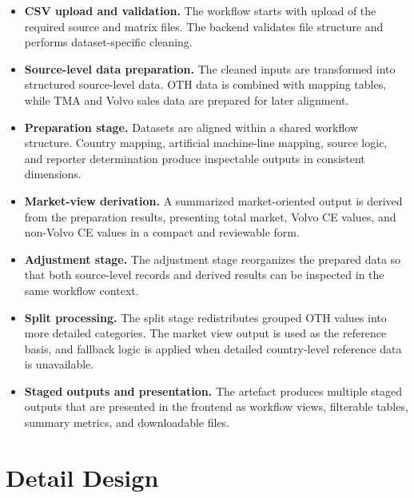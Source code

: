 \begin{itemize}
    \item \textbf{CSV upload and validation.}  
    The workflow starts with upload of the required source and matrix files. The backend validates file structure and performs dataset-specific cleaning.

    \item \textbf{Source-level data preparation.}  
    The cleaned inputs are transformed into structured source-level data. OTH data is combined with mapping tables, while TMA and Volvo sales data are prepared for later alignment.

    \item \textbf{Preparation stage.}  
    Datasets are aligned within a shared workflow structure. Country mapping, artificial machine-line mapping, source logic, and reporter determination produce inspectable outputs in consistent dimensions.

    \item \textbf{Market-view derivation.}  
    A summarized market-oriented output is derived from the preparation results, presenting total market, Volvo CE values, and non-Volvo CE values in a compact and reviewable form.

    \item \textbf{Adjustment stage.}  
    The adjustment stage reorganizes the prepared data so that both source-level records and derived results can be inspected in the same workflow context.

    \item \textbf{Split processing.}  
    The split stage redistributes grouped OTH values into more detailed categories. The market view output is used as the reference basis, and fallback logic is applied when detailed country-level reference data is unavailable.

    \item \textbf{Staged outputs and presentation.}  
    The artefact produces multiple staged outputs that are presented in the frontend as workflow views, filterable tables, summary metrics, and downloadable files.
\end{itemize}






\section{Detail Design}

